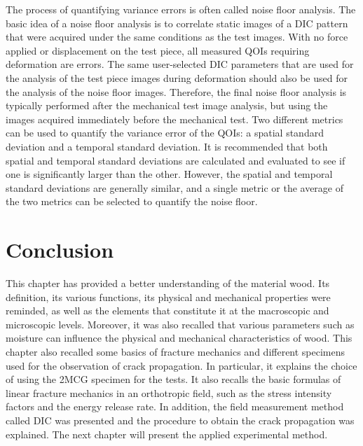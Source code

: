 The process of quantifying variance errors is often called noise floor analysis. The basic idea of a noise floor analysis is to correlate static images of a DIC pattern that were acquired under the same conditions as the test images. With no force applied or displacement on the test piece, all measured QOIs requiring deformation are errors. The same user-selected DIC parameters that are used for the analysis of the test piece images during deformation should also be used for the analysis of the noise floor images. Therefore, the final noise floor analysis is typically performed after the mechanical test image analysis, but using the images acquired immediately before the mechanical test.
Two different metrics can be used to quantify the variance error of the QOIs: a spatial standard deviation and a temporal standard deviation. It is recommended that both spatial and temporal standard deviations are calculated and evaluated to see if one is significantly larger than the other. However, the spatial and temporal standard deviations are generally similar, and a single metric or the average of the two metrics can be selected to quantify the noise floor. 


\section{Conclusion}

This chapter has provided a better understanding of the material wood. Its definition, its various functions, its physical and mechanical properties were reminded, as well as the elements that constitute it at the macroscopic and microscopic levels. Moreover, it was also recalled that various parameters such as moisture can influence the physical and mechanical characteristics of wood.
This chapter also recalled some basics of fracture mechanics and different specimens used for the observation of crack propagation. In particular, it explains the choice of using the 2MCG specimen for the tests. It also recalls the basic formulas of linear fracture mechanics in an orthotropic field, such as the stress intensity factors and the energy release rate. In addition, the field measurement method called DIC was presented and the procedure to obtain the crack propagation was explained. The next chapter will present the applied experimental method.


